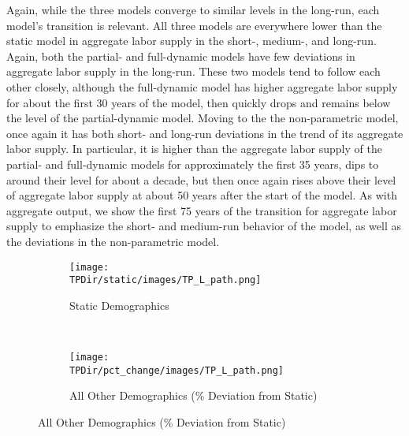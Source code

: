 \documentclass[10pt]{article}
\numberwithin{equation}{subsection}
\newcommand*{\TPDir}{../../code/Rick/OUTPUT/TP}
\begin{document}
\par Again, while the three models converge to similar levels in the long-run, each model's transition is relevant. All three models are everywhere lower than the static model in aggregate labor supply in the \mbox{short-,} \mbox{medium-,} and long-run. Again, both the partial- and full-dynamic models have few deviations in aggregate labor supply in the long-run. These two models tend to follow each other closely, although the full-dynamic model has higher aggregate labor supply for about the first 30 years of the model, then quickly drops and remains below the level of the partial-dynamic model. Moving to the the non-parametric model, once again it has both short- and long-run deviations in the trend of its aggregate labor supply. In particular, it is higher than the aggregate labor supply of the partial- and full-dynamic models for approximately the first 35 years, dips to around their level for about a decade, but then once again rises above their level of aggregate labor supply at about 50 years after the start of the model. As with aggregate output, we show the first 75 years of the transition for aggregate labor supply to emphasize the short- and medium-run behavior of the model, as well as the deviations in the non-parametric model.

\begin{figure}[H]
   \caption{\label{fig:tp_L_pct}Time Path of Aggregate Labor Supply \(\hat{L}_t\)}
   \begin{subfigure}{0.5\textwidth}
      \centering
      \texttt{[image: \\TPDir/static/images/TP\_L\_path.png]}
      \caption{Static Demographics}
   \end{subfigure}%
   ~
   \begin{subfigure}{0.5\textwidth}
      \centering
      \texttt{[image: \\TPDir/pct\_change/images/TP\_L\_path.png]}
      \caption{All Other Demographics (\% Deviation from Static)}
   \end{subfigure}
\end{figure}

\end{document}
